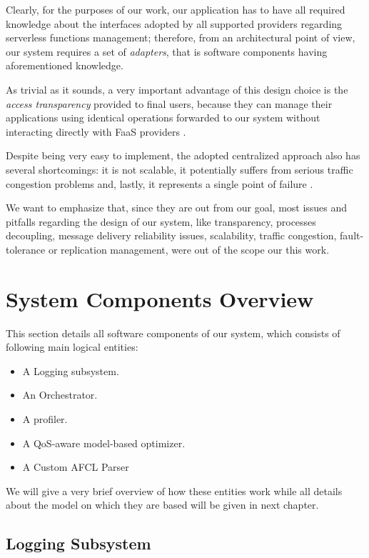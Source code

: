 \documentclass[12pt,a4paper]{report}
\begin{document}
Clearly, for the purposes of our work, our application has to have all required knowledge about the interfaces adopted by all supported providers regarding serverless functions management; therefore, from an architectural point of view, our system requires a set of \textit{adapters}\cite{SDCC}, that is software components having aforementioned knowledge. 

As trivial as it sounds, a very important advantage of this design choice is the \textit{access transparency} provided to final users, because they can manage their applications using identical operations forwarded to our system without interacting directly with FaaS providers \cite{SDCC}.

Despite being very easy to implement, the adopted centralized approach also has several shortcomings: it is not scalable, it potentially suffers from serious traffic congestion problems and, lastly, it represents a single point of failure \cite{SDCC}. 

We want to emphasize that, since they are out from our goal, most issues and pitfalls regarding the design of our system, like transparency, processes decoupling, message delivery reliability issues, scalability, traffic congestion, fault-tolerance or replication management, were out of the scope our this work.

\section{System Components Overview}

This section details all software components of our system, which consists of following main logical entities:

\begin{itemize}
	\item A Logging subsystem.
	\item An Orchestrator.
	\item A profiler.
	\item A QoS-aware model-based optimizer.
	\item A Custom AFCL Parser
\end{itemize}

We will give a very brief overview of how these entities work while all details about the model on which they are based will be given in next chapter.

\subsection{Logging Subsystem}
\end{document}
